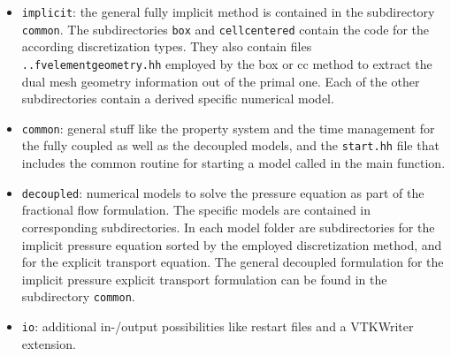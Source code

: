 \begin{itemize} 

\item \texttt{implicit}:
the general fully implicit method is contained in the subdirectory \texttt{common}. 
The subdirectories \texttt{box} and \texttt{cellcentered} contain the code for the according 
discretization types. They also contain files \texttt{..fvelementgeometry.hh} employed 
by the box or cc method to extract the dual mesh geometry information out of the primal one. 
Each of the other subdirectories contain a derived specific numerical model. 

\item \texttt{common}:
general stuff like the property system and the time management for the 
fully coupled as well as the decoupled models, 
and the \texttt{start.hh} file that includes the common routine for starting a model called in the main function. 

\item \texttt{decoupled}:
 numerical models to solve the pressure equation as part of the fractional flow formulation. The specific models are contained 
 in corresponding subdirectories. In each model folder are subdirectories for the implicit pressure equation sorted by the employed discretization method, and for the explicit transport equation. The general decoupled formulation for the implicit pressure explicit transport formulation can be found in the subdirectory \texttt{common}.




\item \texttt{io}: additional in-/output possibilities like restart files 
and a VTKWriter extension. 


\end{itemize}
